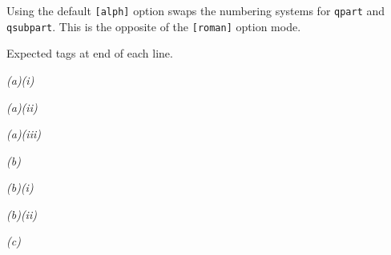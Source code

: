 \documentclass[a4paper,12pt]{article}
\begin{document}
	Using the default \verb|[alph]| option swaps the numbering systems for \verb|qpart| and \verb|qsubpart|. This is the opposite of the \verb|[roman]| option mode.
	
	Expected tags at end of each line.
	
	\begin{question}
	\qpart\qsubpart
	\lipsum[1][1-4] \emph{(a)(i)}
	
	\qsubpart
	\lipsum[1][5-6] \emph{(a)(ii)}
	
	\qsubpart
	\lipsum[1][7] \emph{(a)(iii)}
	
	\qpart
	\lipsum[2][1-3] \emph{(b)}
	
	\qsubpart
	\lipsum[2][4-5] \emph{(b)(i)}
	
	\qsubpart
	\lipsum[2][6-8] \emph{(b)(ii)}
	
	\qpart
	\lipsum[3][1] \emph{(c)}
\end{question}
\end{document}
